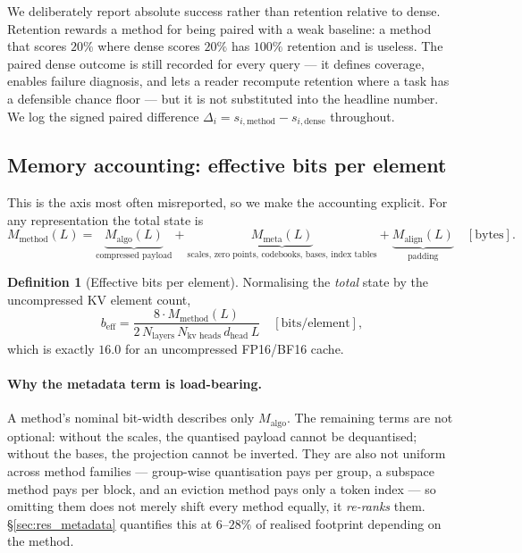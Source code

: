 \documentclass{article}
\theoremstyle{definition}
\newtheorem{definition}{Definition}
\newcommand{\beff}{b_{\text{eff}}}
\begin{document}
We deliberately report absolute success rather than retention relative to dense. Retention rewards a method for being paired with a weak baseline: a method that scores $20\%$ where dense scores $20\%$ has $100\%$ retention and is useless. The paired dense outcome is still recorded for every query --- it defines coverage, enables failure diagnosis, and lets a reader recompute retention where a task has a defensible chance floor --- but it is not substituted into the headline number. We log the signed paired difference $\Delta_i = s_{i,\text{method}} - s_{i,\text{dense}}$ throughout.

\subsection{Memory accounting: effective bits per element}
\label{sec:beff}

This is the axis most often misreported, so we make the accounting explicit. For any representation the total state is
\begin{equation}
\label{eq:memory}
M_{\text{method}}(L) = \underbrace{M_{\text{algo}}(L)}_{\text{compressed payload}} + \underbrace{M_{\text{meta}}(L)}_{\text{scales, zero points, codebooks, bases, index tables}} + \underbrace{M_{\text{align}}(L)}_{\text{padding}} \quad [\text{bytes}].
\end{equation}

\begin{definition}[Effective bits per element]
\label{def:beff}
Normalising the \emph{total} state by the uncompressed KV element count,
\begin{equation}
\label{eq:beff}
\beff = \frac{8 \cdot M_{\text{method}}(L)}{2 \, N_{\text{layers}} \, N_{\text{kv heads}} \, d_{\text{head}} \, L} \quad [\text{bits/element}],
\end{equation}
which is exactly $16.0$ for an uncompressed FP16/BF16 cache.
\end{definition}

\paragraph{Why the metadata term is load-bearing.} A method's nominal bit-width describes only $M_{\text{algo}}$. The remaining terms are not optional: without the scales, the quantised payload cannot be dequantised; without the bases, the projection cannot be inverted. They are also not uniform across method families --- group-wise quantisation pays per group, a subspace method pays per block, and an eviction method pays only a token index --- so omitting them does not merely shift every method equally, it \emph{re-ranks} them. \S\ref{sec:res_metadata} quantifies this at $6$--$28\%$ of realised footprint depending on the method.
\end{document}
